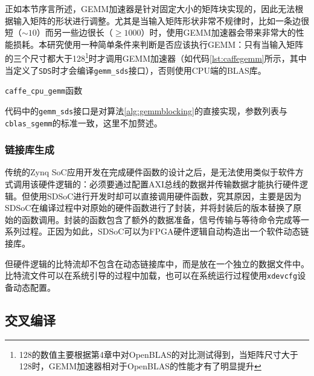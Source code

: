 
正如本节序言所述，GEMM加速器是针对固定大小的矩阵块实现的，因此无法根据输入矩阵的形状进行调整。尤其是当输入矩阵形状非常不规律时，比如一条边很短（$\sim 10$）而另一些边很长（$\geq 1000$）时，使用GEMM加速器会带来非常大的性能损耗。本研究使用一种简单条件来判断是否应该执行GEMM：只有当输入矩阵的三个尺寸都大于128\footnote{128的数值主要根据第4章中对OpenBLAS的对比测试得到，当矩阵尺寸大于128时，GEMM加速器相对于OpenBLAS的性能才有了明显提升}时才调用GEMM加速器（如代码\ref{lst:caffegemm}所示，其中当定义了\texttt{SDS}时才会编译\texttt{gemm\_sds}接口），否则使用CPU端的BLAS库。

\begin{listing}[!ht]

\caption{\texttt{caffe\_cpu\_gemm}函数}
\label{lst:caffegemm}
\end{listing}

代码中的\texttt{gemm\_sds}接口是对算法\ref{alg:gemmblocking}的直接实现，参数列表与\texttt{cblas\_sgemm}的标准一致，这里不加赘述。

\subsubsection{链接库生成}

传统的Zynq SoC应用开发在完成硬件函数的设计之后，是无法使用类似于软件方式调用该硬件逻辑的：必须要通过配置AXI总线的数据并传输数据才能执行硬件逻辑。但使用SDSoC进行开发时却可以直接调用硬件函数，究其原因，主要是因为SDSoC在编译过程中对原始的硬件函数进行了封装，并将封装后的版本替换了原始的函数调用。封装的函数包含了额外的数据准备，信号传输与等待命令完成等一系列过程。正因为如此，SDSoC可以为FPGA硬件逻辑自动构造出一个软件动态链接库。

但硬件逻辑的比特流却不包含在动态链接库中，而是放在一个独立的数据文件中。比特流文件可以在系统引导的过程中加载，也可以在系统运行过程使用\texttt{xdevcfg}设备动态配置。

\subsection{交叉编译}

